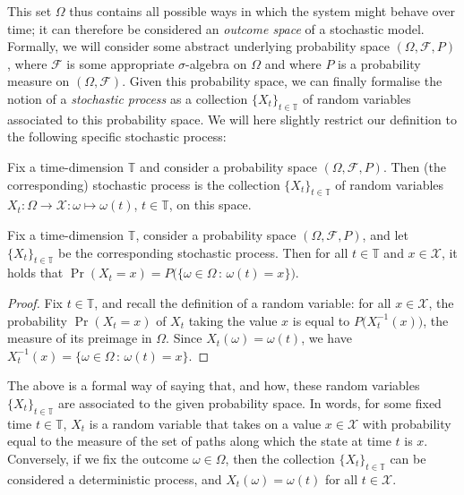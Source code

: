 \documentclass[graybox]{svmult}
\newcommand{\states}{\mathcal{X}}
\newcommand{\timedim}{\mathbb{T}}
\begin{document}
This set $\Omega$ thus contains all possible ways in which the system might behave over time; it can therefore be considered an \emph{outcome space} of a stochastic model. Formally, we will consider some abstract underlying probability space $(\Omega,\mathcal{F},P)$, where $\mathcal{F}$ is some appropriate $\sigma$-algebra on $\Omega$ and where $P$ is a probability measure on $(\Omega,\mathcal{F})$. Given this probability space, we can finally formalise the notion of a \emph{stochastic process} as a collection $\{X_t\}_{t\in\timedim}$ of random variables associated to this probability space. We will here slightly restrict our definition to the following specific stochastic process:
\begin{definition}\label{def:stochastic_process}
Fix a time-dimension $\timedim$ and consider a probability space $(\Omega,\mathcal{F},P)$. Then (the corresponding) stochastic process is the collection $\{X_t\}_{t\in\timedim}$ of random variables $X_t:\Omega\to\states:\omega\mapsto\omega(t)$, $t\in\timedim$, on this space.
\end{definition}
\begin{corollary}\label{cor:process_prob_is_measure}
Fix a time-dimension $\timedim$, consider a probability space $(\Omega,\mathcal{F},P)$, and let $\{X_t\}_{t\in\timedim}$ be the corresponding stochastic process. Then for all $t\in\timedim$ and $x\in\states$, it holds that $\Pr(X_t=x) = P\bigl( \{\omega\in\Omega\,:\,\omega(t)=x\} \bigr)$.
\end{corollary}
\begin{proof}
Fix $t\in\timedim$, and recall the definition of a random variable: for all $x\in\states$, the probability $\Pr(X_t=x)$ of $X_t$ taking the value $x$ is equal to $P\bigl(X_t^{-1}(x)\bigr)$, the measure of its preimage in $\Omega$. Since $X_t(\omega)=\omega(t)$, we have $X_t^{-1}(x)=\{\omega\in\Omega\,:\,\omega(t)=x\}$.
\end{proof}
The above is a formal way of saying that, and how, these random variables $\{X_t\}_{t\in\timedim}$ are associated to the given probability space. In words, for some fixed time $t\in\timedim$, $X_t$ is a random variable that takes on a value $x\in\states$ with probability equal to the measure of the set of paths along which the state at time $t$ is $x$. Conversely, if we fix the outcome $\omega\in\Omega$, then the collection $\{X_t\}_{t\in\timedim}$ can be considered a deterministic process, and $X_t(\omega)=\omega(t)$ for all $t\in\states$.
\end{document}

